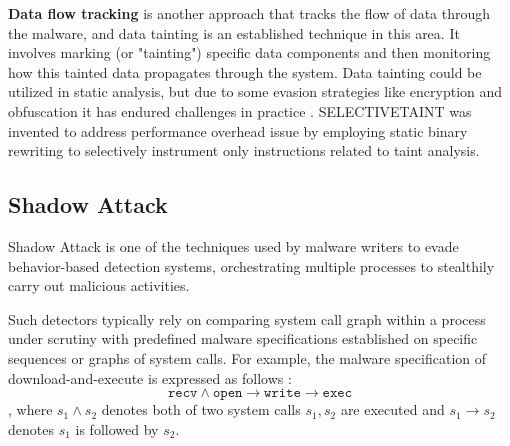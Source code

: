 \textbf{Data flow tracking} is another approach that tracks the flow of data through the malware, and data tainting is an established
technique in this area. It involves marking (or "tainting") specific data components and then monitoring
how this tainted data propagates through the system.
Data tainting could be utilized in static analysis, but due to some evasion strategies like encryption and obfuscation
it has endured challenges in practice \cite{alashjee2019dynamic}.
SELECTIVETAINT \cite{chen2021selectivetaint} was invented to address performance overhead issue by employing static binary
rewriting to selectively instrument only instructions related to taint analysis.


\subsection{Shadow Attack \cite{Weiqin:ShadowAttack}}
Shadow Attack is one of the techniques used by malware writers to evade behavior-based detection systems,
orchestrating multiple processes to stealthily carry out malicious activities.

Such detectors typically rely on comparing system call graph within a process under scrutiny with predefined
malware specifications established on specific sequences or graphs of system calls\cite{inproceedings}.
For example, the malware specification of download-and-execute is expressed as follows \cite{Weiqin:ShadowAttack}:
\begin{equation}
  \texttt{recv} \land \texttt{open} \rightarrow \texttt{write} \rightarrow \texttt{exec}
\end{equation}
, where $s_1 \land s_2$ denotes both of two system calls $s_1, s_2$ are executed and $s_1 \rightarrow s_2$
denotes $s_1$ is followed by $s_2$.

